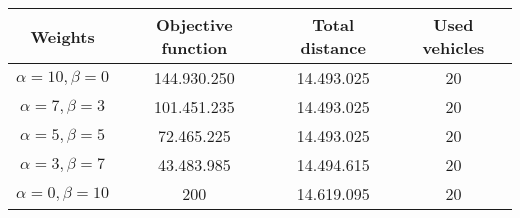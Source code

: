 {
\renewcommand{\arraystretch}{2}
\begin{longtable}[h]{| c | c | c | c |}
    \hline
    \textbf{Weights} & \textbf{Objective function} & \textbf{Total distance} & \textbf{Used vehicles} \\
    \hline
    \endhead
    $\alpha = 10, \beta = 0$ & 144.930.250 & 14.493.025 & 20 \\
    \hline
    $\alpha = 7, \beta = 3$  & 101.451.235 & 14.493.025 & 20 \\
    \hline
    $\alpha = 5, \beta = 5$  &  72.465.225 & 14.493.025 & 20 \\
    \hline
    $\alpha = 3, \beta = 7$  &  43.483.985 & 14.494.615 & 20 \\
    \hline
    $\alpha = 0, \beta = 10$ &         200 & 14.619.095 & 20 \\
    \hline
\end{longtable}
}